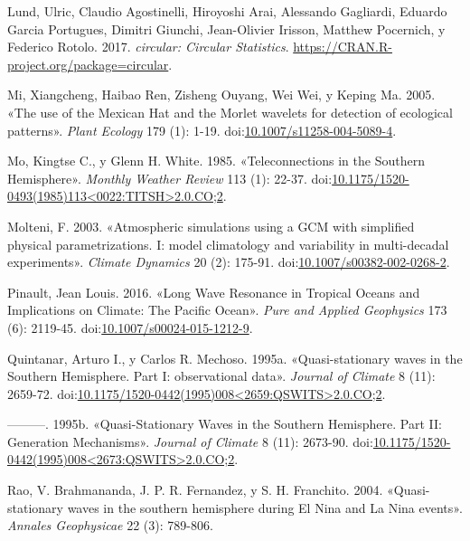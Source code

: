 \documentclass[spanish,a4paper,12p]{book}
\begin{document}
\hypertarget{ref-R-circular}{}
Lund, Ulric, Claudio Agostinelli, Hiroyoshi Arai, Alessando Gagliardi,
Eduardo Garcia Portugues, Dimitri Giunchi, Jean-Olivier Irisson, Matthew
Pocernich, y Federico Rotolo. 2017. \emph{circular: Circular
Statistics}. \url{https://CRAN.R-project.org/package=circular}.

\hypertarget{ref-Mi2005}{}
Mi, Xiangcheng, Haibao Ren, Zisheng Ouyang, Wei Wei, y Keping Ma. 2005.
«The use of the Mexican Hat and the Morlet wavelets for detection of
ecological patterns». \emph{Plant Ecology} 179 (1): 1-19.
doi:\href{https://doi.org/10.1007/s11258-004-5089-4}{10.1007/s11258-004-5089-4}.

\hypertarget{ref-Mo1985}{}
Mo, Kingtse C., y Glenn H. White. 1985. «Teleconnections in the Southern
Hemisphere». \emph{Monthly Weather Review} 113 (1): 22-37.
doi:\href{https://doi.org/10.1175/1520-0493(1985)113\%3C0022:TITSH\%3E2.0.CO;2}{10.1175/1520-0493(1985)113\textless{}0022:TITSH\textgreater{}2.0.CO;2}.

\hypertarget{ref-Molteni2003}{}
Molteni, F. 2003. «Atmospheric simulations using a GCM with simplified
physical parametrizations. I: model climatology and variability in
multi-decadal experiments». \emph{Climate Dynamics} 20 (2): 175-91.
doi:\href{https://doi.org/10.1007/s00382-002-0268-2}{10.1007/s00382-002-0268-2}.

\hypertarget{ref-Pinault2016}{}
Pinault, Jean Louis. 2016. «Long Wave Resonance in Tropical Oceans and
Implications on Climate: The Pacific Ocean». \emph{Pure and Applied
Geophysics} 173 (6): 2119-45.
doi:\href{https://doi.org/10.1007/s00024-015-1212-9}{10.1007/s00024-015-1212-9}.

\hypertarget{ref-Quintanar1995a}{}
Quintanar, Arturo I., y Carlos R. Mechoso. 1995a. «Quasi-stationary
waves in the Southern Hemisphere. Part I: observational data».
\emph{Journal of Climate} 8 (11): 2659-72.
doi:\href{https://doi.org/10.1175/1520-0442(1995)008\%3C2659:QSWITS\%3E2.0.CO;2}{10.1175/1520-0442(1995)008\textless{}2659:QSWITS\textgreater{}2.0.CO;2}.

\hypertarget{ref-Quintanar1995}{}
---------. 1995b. «Quasi-Stationary Waves in the Southern Hemisphere.
Part II: Generation Mechanisms». \emph{Journal of Climate} 8 (11):
2673-90.
doi:\href{https://doi.org/10.1175/1520-0442(1995)008\%3C2673:QSWITS\%3E2.0.CO;2}{10.1175/1520-0442(1995)008\textless{}2673:QSWITS\textgreater{}2.0.CO;2}.

\hypertarget{ref-Rao2004}{}
Rao, V. Brahmananda, J. P. R. Fernandez, y S. H. Franchito. 2004.
«Quasi-stationary waves in the southern hemisphere during El Nina and La
Nina events». \emph{Annales Geophysicae} 22 (3): 789-806.
\end{document}
